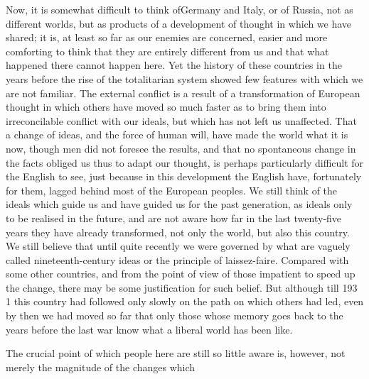 \documentclass[11pt,openany]{book}
\begin{document}
Now, it is somewhat difficult to think ofGermany and Italy, or of Russia, not as different worlds, but as products of a development of thought in which we have shared; it is, at least so far as our enemies are concerned, easier and more comforting to think that they are entirely different from us and that what happened there cannot happen here. Yet the history of these countries in the years before the rise of the totalitarian system showed few features with which we are not familiar. The external conflict is a result of a transformation of European thought in which others have moved so much faster as to bring them into irreconcilable conflict with our ideals, but which has not left us unaffected. That a change of ideas, and the force of human will, have made the world what it is now, though men did not foresee the results, and that no spontaneous change in the facts obliged us thus to adapt our thought, is perhaps particularly difficult for the English to see, just because in this development the English have, fortunately for them, lagged behind most of the European peoples. We still think of the ideals which guide us and have guided us for the past generation, as ideals only to be realised in the future, and are not aware how far in the last twenty-five years they have already transformed, not only the world, but also this country. We still believe that until quite recently we were governed by what are vaguely called nineteenth-century ideas or the principle of laissez-faire. Compared with some other countries, and from the point of view of those impatient to speed up the change, there may be some justification for such belief. But although till 193 1 this country had followed only slowly on the path on which others had led, even by then we had moved so far that only those whose memory goes back to the years before the last war know what a liberal world has been like.

The crucial point of which people here are still so little aware is, however, not merely the magnitude of the changes which
\end{document}
